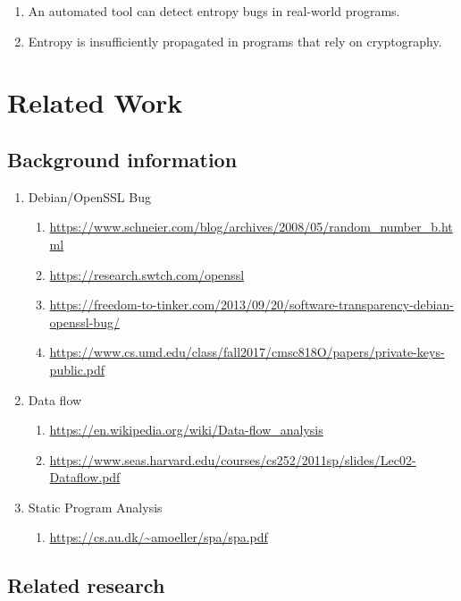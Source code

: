 \documentclass[letterpaper,twocolumn,10pt]{article}
\begin{document}
\begin{enumerate}
	\item An automated tool can detect entropy bugs in real-world programs.
	\item Entropy is insufficiently propagated in programs that rely on cryptography.
\end{enumerate}

\section{Related Work}

\subsection{Background information}

\begin{enumerate}
	\item Debian/OpenSSL Bug 
		\begin{enumerate}
			\item \url{https://www.schneier.com/blog/archives/2008/05/random_number_b.html}
			\item \url{https://research.swtch.com/openssl}
			\item \url{https://freedom-to-tinker.com/2013/09/20/software-transparency-debian-openssl-bug/}
			\item \url{https://www.cs.umd.edu/class/fall2017/cmsc818O/papers/private-keys-public.pdf}
		\end{enumerate}
	\item Data flow
		\begin{enumerate}
			\item \url{https://en.wikipedia.org/wiki/Data-flow_analysis}
			\item \url{https://www.seas.harvard.edu/courses/cs252/2011sp/slides/Lec02-Dataflow.pdf}
		\end{enumerate}
	\item Static Program Analysis
		\begin{enumerate}
			\item \url{https://cs.au.dk/~amoeller/spa/spa.pdf}
		\end{enumerate}

\end{enumerate}

\subsection{Related research}

\end{document}
